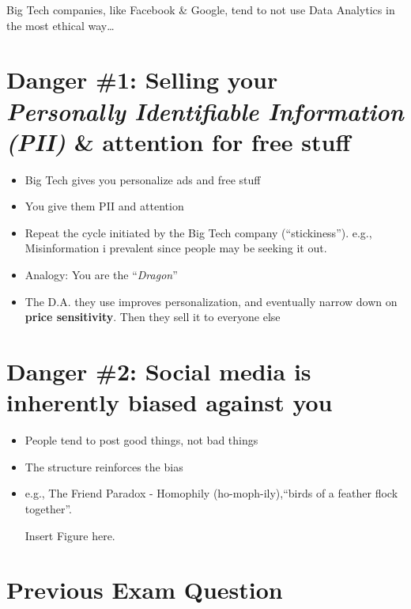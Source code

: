 
Big Tech companies, like Facebook \& Google, tend to not use Data Analytics in the most ethical way\ldots

\section{Danger \#1: Selling your \textit{Personally Identifiable Information (PII)} \& attention for free stuff}

\begin{itemize}
  \item Big Tech gives you personalize ads and free stuff
  \item You give them PII and attention
  \item Repeat the cycle initiated by the Big Tech company (``stickiness''). e.g., Misinformation i prevalent since people may be seeking it out.
  \item Analogy: You are the ``\textit{Dragon}''
  \item The D.A. they use improves personalization, and eventually narrow down on \textbf{price sensitivity}. Then they sell it to everyone else
\end{itemize}

\section{Danger \#2: Social media is inherently biased against you}

\begin{itemize}
  \item People tend to post good things, not bad things
  \item The structure reinforces the bias
  \item e.g., The Friend Paradox - Homophily (ho-moph-ily),``birds of a feather flock together''.

        Insert Figure here.
\end{itemize}

\section{Previous Exam Question}

